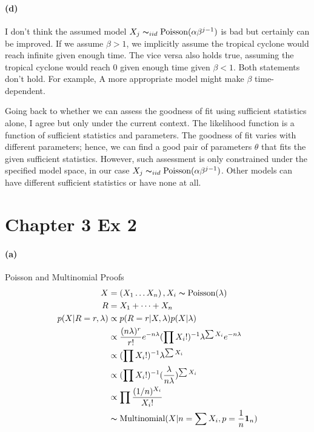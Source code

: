 \documentclass[11pt, letterpaper]{article}
\begin{document}
\paragraph{(d)}
I don't think the assumed model $X_j \thicksim_{iid} \text{Poisson}(\alpha \beta^{j-1})$ is bad but certainly can be improved. If we assume $\beta > 1$, we implicitly assume the tropical cyclone would reach infinite given enough time. The vice versa also holds true, assuming the tropical cyclone would reach 0 given enough time given $\beta < 1$. Both statements don't hold. For example, A more appropriate model might make $\beta$ time-dependent.

Going back to whether we can assess the goodness of fit using sufficient statistics alone, I agree but only under the current context. The likelihood function is a function of sufficient statistics and parameters. The goodness of fit varies with different parameters; hence, we can find a good pair of parameters $\theta$ that fits the given sufficient statistics. However, such assessment is only constrained under the specified model space, in our case $X_j \thicksim_{iid} \text{Poisson}(\alpha \beta^{j-1})$. Other models can have different sufficient statistics or have none at all.

\newpage
\section{Chapter 3 Ex 2}
\paragraph{(a)} Poisson and Multinomial Proofs
\begin{align*}
    X &= (X_1 \dots X_n)\, , X_i \thicksim \text{Poisson}(\lambda) \\
    R &= X_1 + \dots + X_n \\
    p(X|R=r, \lambda) &\propto p(R=r|X, \lambda) p(X|\lambda) \\
        &\propto \frac{(n\lambda)^r}{r!} e^{-n\lambda} (\prod X_i!)^{-1} \lambda^{\sum X_i} e^{-n\lambda} \\
        &\propto (\prod X_i!)^{-1} \lambda^{\sum X_i} \\
        &\propto (\prod X_i!)^{-1} (\frac{\lambda}{n\lambda})^{\sum X_i} \\
        &\propto \prod \frac{(1/n)^{X_i}}{X_i!} \\
        &\thicksim \text{Multinomial}(X|n=\sum X_i, p=\frac{1}{n}\mathbf{1}_n)
\end{align*}
\end{document}
